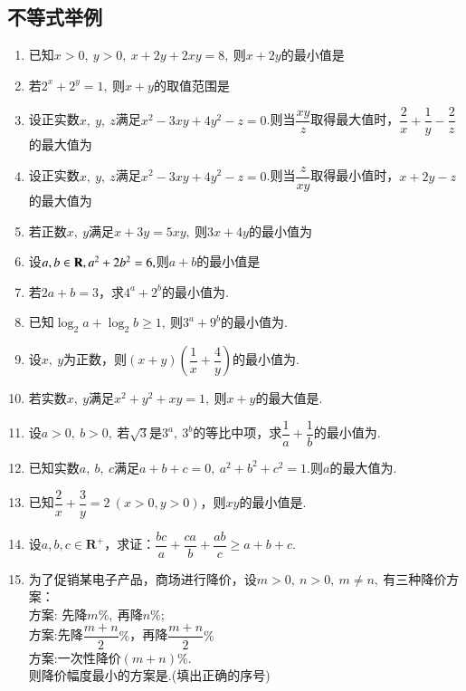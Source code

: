 \documentclass{BHCexam}
\begin{document}
\subsection{不等式举例}
\begin{enumerate}[1)]
\item 已知$ x>0,~y>0 ,~x+2y+2xy=8,~$则$ x+2y $的最小值是\xx
{}
\item 若$ 2^x+2^y=1 ,~$则$ x+y $的取值范围是\xx
{}
\item 设正实数$ x,~y,~z $满足$ x^2-3xy+4y^2-z=0 $.则当$ \dfrac{xy}{z} $取得最大值时，$ \dfrac{2}{x}+\dfrac{1}{y}-\dfrac{2}{z} $的最大值为\xx
{}
\item 设正实数$ x,~y,~z $满足$ x^2-3xy+4y^2-z=0 $.则当$ \dfrac{z}{xy} $取得最小值时，$ x+2y-z $的最大值为\xx
{}
\item 若正数$ x,~y $满足$ x+3y=5xy,~ $则$ 3x+4y $的最小值为\xx
{}
\item 设$ a,b\in\mathbf{R},a^2+2b^2=6, $则$ a+b $的最小值是\xx
{}
\item 若$ 2a+b=3 $，求$ 4^a+2^b $的最小值为\tk.
\item 已知$ \log_2a+\log_2b\ge1 ,~$则$ 3^a+9^b $的最小值为\tk.
\item 设$ x,~y $为正数，则$ (x+y)\left(\dfrac{1}{x}+\dfrac{4}{y}\right) $的最小值为\tk.
\item 若实数$ x,~y $满足$ x^2+y^2+xy=1,~ $则$ x+y $的最大值是\tk.
\item 设$ a>0,~b>0,~ $若$ \sqrt{3} $是$ 3^a,~3^b $的等比中项，求$ \dfrac{1}{a}+\dfrac{1}{b} $的最小值为\tk.
\item 已知实数$ a,~b,~c $满足$ a+b+c=0,~a^2+b^2+c^2=1. $则$ a $的最大值为\tk.
\item 已知$ \dfrac{2}{x}+\dfrac{3}{y}=2~(x>0,y>0 ) $，则$xy$的最小值是\tk.
\item 设$ a,b,c\in \mathbf{R^+} $，求证：$ \dfrac{bc}{a}+\dfrac{ca}{b}+\dfrac{ab}{c}\ge a+b+c. $
\item 为了促销某电子产品，商场进行降价，设$ m>0,~n>0,~m\ne n,~ $有三种降价方案：\\
方案: 先降$ m\%,~ $再降$n\%  $;\\
方案:先降$ \dfrac{m+n}{2}\% $，再降$ \dfrac{m+n}{2}\% $\\
方案:一次性降价$ \left(m+n\right) \%$.\\
则降价幅度最小的方案是\tk.(填出正确的序号)
\end{enumerate}
\end{document}
